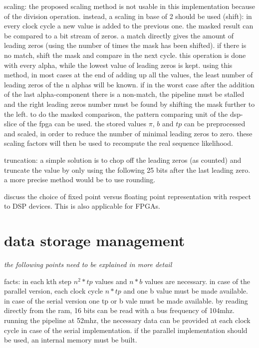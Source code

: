 \documentclass[mscthesis]{usiinfthesis}
\begin{document}
scaling: the proposed scaling method is not usable in this implementation
because of the division operation. instead, a scaling in base of 2 should be
used (shift): in every clock cycle a new value is added to the previous one.
the masked result can be compared to a bit stream of zeros. a match directly
gives the amount of leading zeros (using the number of times the mask has been
shifted). if there is no match, shift the mask and compare in the next cycle.
this operation is done with every alpha, while the lowest value of leading
zeros is kept. using this method, in most cases at the end of adding up all the
values, the least number of leading zeros of the n alphas will be known. if in
the worst case after the addition of the last alpha-component there is
a non-match, the pipeline must be stalled and the right leading zeros number
must be found by shifting the mask further to the left. to do the masked
comparison, the pattern comparing unit of the dsp-slice of the fpga can be
used. the stored values $ \pi $, $ b $ and $ tp $ can be preprocessed and
scaled, in order to reduce the number of minimal leading zeros to zero. these
scaling factors will then be used to recompute the real sequence likelihood.

truncation: a simple solution is to chop off the leading zeros (as counted) and
truncate the value by only using the following 25 bits after the last leading
zero. a more precise method would be to use rounding.

\cite{smith97, ti04} discuss the choice of fixed point versus floating point
representation with respect to DSP devices. This is also applicable for FPGAs.


\section{data storage management}

\emph{\color{red}the following points need to be explained in more detail}

facts:
in each kth step $ n^2*tp $ values and $ n*b $ values are necessary. in case of
the parallel version, each clock cycle $ n*tp $ and one b value must be made
available. in case of the serial version one tp or b vale must be made
available. by reading directly from the ram, 16 bits can be read with a bus
frequency of 104mhz. running the pipeline at 52mhz, the necessary data can be
provided at each clock cycle in case of the serial implementation. if the
parallel implementation should be used, an internal memory must be built.
\end{document}
